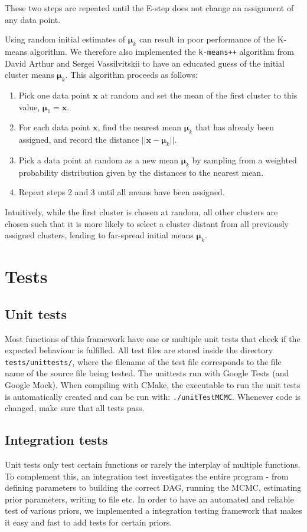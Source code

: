 \documentclass[a4paper,11pt]{article}
\def\x{\boldsymbol{x}}
\def\bmu{\boldsymbol{\mu}}
\begin{document}
These two steps are repeated until the E-step does not change an assignment of any data point.

Using random initial estimates of $\bmu_k$ can result in poor performance of the K-means algorithm. We therefore also implemented the \texttt{k-means++} algorithm from David Arthur and Sergei Vassilvitskii to have an educated guess of the initial cluster means $\bmu_k$. This algorithm proceeds as follows:

\begin{enumerate}
 \item Pick one data point $\x$ at random and set the mean of the first cluster to this value, $\bmu_1 = \x$.
 \item For each data point $\x$, find the nearest mean $\bmu_k$ that has already been assigned, and record the distance $||\x - \bmu_k||$.
 \item Pick a data point at random as a new mean $\bmu_k$ by sampling from a weighted probability distribution given by the distances to the nearest mean.
 \item Repeat steps 2 and 3 until all means have been assigned.
\end{enumerate}

Intuitively, while the first cluster is chosen at random, all other clusters are chosen such that it is more likely to select a cluster distant from all previously assigned clusters, leading to far-spread initial means $\bmu_k$.

\section{Tests}
\subsection{Unit tests}
Most functions of this framework have one or multiple unit tests that check if the expected behaviour is fulfilled. All test files are stored inside the directory \texttt{tests/unittests/}, where the filename of the test file corresponds to the file name of the source file being tested. The unittests run with Google Tests (and Google Mock). When compiling with CMake, the executable to run the unit tests is automatically created and can be run with: \texttt{./unitTestMCMC}. Whenever code is changed, make sure that all tests pass.

\subsection{Integration tests}
Unit tests only test certain functions or rarely the interplay of multiple functions. To complement this, an integration test investigates the entire program - from defining parameters to building the correct DAG, running the MCMC, estimating prior parameters, writing to file etc. In order to have an automated and reliable test of various priors, we implemented a integration testing framework that makes it easy and fast to add tests for certain priors.
\end{document}
